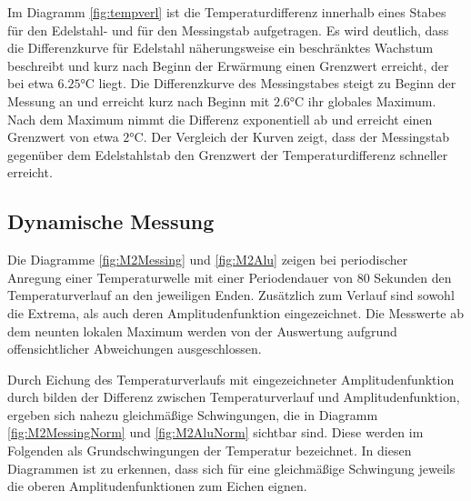 Im Diagramm \ref{fig:tempverl} ist die Temperaturdifferenz innerhalb eines Stabes für den Edelstahl- und für den Messingstab aufgetragen. 
Es wird deutlich, dass die Differenzkurve für Edelstahl näherungsweise ein beschränktes Wachstum beschreibt und kurz nach Beginn der Erwärmung einen Grenzwert erreicht, der bei etwa  $6.25 \si{\degreeCelsius}$ liegt.
Die Differenzkurve des Messingstabes steigt zu Beginn der Messung an und erreicht kurz nach Beginn mit $2.6 \si{\degreeCelsius}$ ihr globales Maximum. 
Nach dem Maximum nimmt die Differenz exponentiell ab und erreicht einen Grenzwert von etwa $2 \si{\degreeCelsius}$.
Der Vergleich der Kurven zeigt, dass der Messingstab gegenüber dem Edelstahlstab den Grenzwert der Temperaturdifferenz schneller erreicht.

\subsection{Dynamische Messung}
Die Diagramme \ref{fig:M2Messing} und \ref{fig:M2Alu} zeigen bei periodischer Anregung einer Temperaturwelle mit einer Periodendauer von 80 Sekunden den Temperaturverlauf an den jeweiligen Enden. 
Zusätzlich zum Verlauf sind sowohl die Extrema, als auch deren Amplitudenfunktion eingezeichnet. 
Die Messwerte ab dem neunten lokalen Maximum werden von der Auswertung aufgrund offensichtlicher Abweichungen ausgeschlossen.

Durch Eichung des Temperaturverlaufs mit eingezeichneter Amplitudenfunktion durch bilden der Differenz zwischen Temperaturverlauf und Amplitudenfunktion, ergeben sich nahezu gleichmäßige Schwingungen, die in Diagramm \ref{fig:M2MessingNorm} und \ref{fig:M2AluNorm} sichtbar sind. 
Diese werden im Folgenden als Grundschwingungen der Temperatur bezeichnet. 
In diesen Diagrammen ist zu erkennen, dass sich für eine gleichmäßige Schwingung jeweils die oberen Amplitudenfunktionen zum Eichen eignen.

